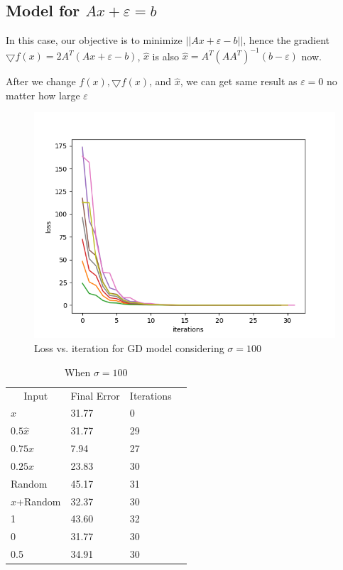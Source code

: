 \documentclass[a4paper]{article}
\begin{document}
\subsection{Model for $Ax+\varepsilon=b$}
    In this case, our objective is to minimize $||Ax+\varepsilon-b||$, hence the gradient $\bigtriangledown f(x)=2A^T(Ax+\varepsilon-b)$, $\hat{x}$ is also $\hat{x}=A^T(AA^T)^{-1}(b-\varepsilon)$ now.
    \par After we change $f(x),\bigtriangledown f(x)$, and $\hat{x}$, we can get same result as $\varepsilon=0$ no matter how large $\varepsilon$
    \begin{figure}[H]
        \centering
        \includegraphics[scale=0.5]{Loss2.png}
        \caption{Loss vs. iteration for GD model considering $\sigma=100$}
    \end{figure}
    \begin{table}[H]
        \centering
        \begin{tabular}{|l|l|l|l}
        \cline{1-3}
        \multicolumn{1}{|c|}{Input} & \multicolumn{1}{c|}{Final Error} & \multicolumn{1}{c|}{Iterations} &  \\ \cline{1-3}
        $\hat{x}$       &  31.77    &0      &  \\ \cline{1-3}
        $0.5\hat{x}$    &  31.77    &29     &  \\ \cline{1-3}
        $0.75x$         &  7.94     &27     &  \\ \cline{1-3}
        $0.25x$         &  23.83    &30     &  \\ \cline{1-3}
        Random          &  45.17    &31     &  \\ \cline{1-3}
        $x$+Random      &  32.37    &30     &  \\ \cline{1-3}
        1               &  43.60    &32     &  \\ \cline{1-3}
        0               &  31.77    &30     &  \\ \cline{1-3}
        0.5             &  34.91    &30     &  \\ \cline{1-3}
        \end{tabular}
        \caption{When $\sigma=100$}
    \end{table}
\end{document}
